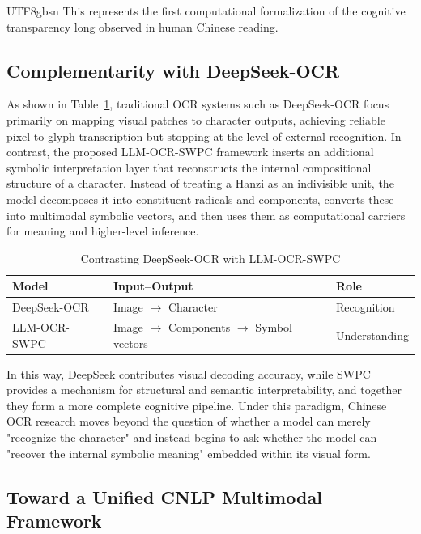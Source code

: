 \documentclass[conference]{IEEEtran}
\begin{document}
\begin{CJK*}{UTF8}{gbsn}
This represents the first computational formalization of the cognitive transparency long observed in human Chinese reading.

\subsection{Complementarity with DeepSeek-OCR}

As shown in Table~\ref{tab:comparision models}, traditional OCR systems such as DeepSeek-OCR focus primarily on mapping visual patches to character outputs, achieving reliable pixel‐to‐glyph transcription but stopping at the level of external recognition. In contrast, the proposed LLM-OCR-SWPC framework inserts an additional symbolic interpretation layer that reconstructs the internal compositional structure of a character. Instead of treating a Hanzi as an indivisible unit, the model decomposes it into constituent radicals and components, converts these into multimodal symbolic vectors, and then uses them as computational carriers for meaning and higher-level inference. 


\begin{table}
\begin{center}
\caption{Contrasting DeepSeek-OCR with LLM-OCR-SWPC}
\label{tab:comparision models}
\begin{tabular}{|l|p{3.1cm}|l|}
\hline
\textbf{Model} & \textbf{Input--Output} & \textbf{Role} \\
\hline
DeepSeek-OCR & Image $\rightarrow$ Character & Recognition \\
\hline
LLM-OCR-SWPC & Image $\rightarrow$ Components $\rightarrow$ Symbol vectors & Understanding \\
\hline
\end{tabular}
\end{center}
\end{table}

In this way, DeepSeek contributes visual decoding accuracy, while SWPC provides a mechanism for structural and semantic interpretability, and together they form a more complete cognitive pipeline. Under this paradigm, Chinese OCR research moves beyond the question of whether a model can merely "recognize the character" and instead begins to ask whether the model can "recover the internal symbolic meaning" embedded within its visual form.
\subsection{Toward a Unified CNLP Multimodal Framework}


\end{CJK*}
\end{document}
